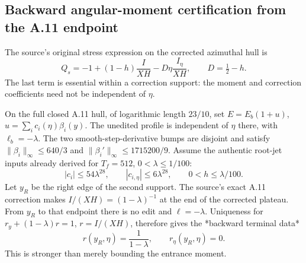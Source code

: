 \subsection*{Backward angular-moment certification from the A.11 endpoint}
\label{subsec:a11-backward-angular-endpoint-20261021}
The source's original stress expression on the corrected azimuthal hull is
\[
Q_s=-1+(1-h)\frac{I}{XH}-D\eta\frac{I_\eta}{XH},
\qquad D=\tfrac12-h.
\]
The last term is essential within a correction support: the moment
and correction coefficients need not be independent of \(\eta\).

On the full closed A.11 hull, of logarithmic length \(23/10\), set
\(E=E_b(1+u)\), \(u=\sum_i c_i(\eta)\beta_i(y)\).
The unedited profile is independent of \(\eta\) there, with
\(\ell_b=-\lambda\). The two smooth-step-derivative bumps are
disjoint and satisfy
\(\|\beta_i\|_\infty\le640/3\) and
\(\|\beta_i'\|_\infty\le1715200/9\).
Assume the authentic root-jet inputs already derived for
\(T_f=512\), \(0<\lambda\le1/100\):
\[
|c_i|\le54\lambda^{28},\qquad
|c_{i,\eta}|\le6\lambda^{28},\qquad
0<h\le\lambda/100.
\]
Let \(y_R\) be the right edge of the second support. The
source's exact A.11 correction makes \(I/(XH)=(1-\lambda)^{-1}\)
at the end of the corrected plateau. From \(y_R\) to that
endpoint there is no edit and \(\ell=-\lambda\). Uniqueness for
\(r_y+(1-\lambda)r=1\), \(r=I/(XH)\), therefore gives the
*backward terminal data*
\[
r(y_R,\eta)=\frac1{1-\lambda},\qquad
r_\eta(y_R,\eta)=0.
\]
This is stronger than merely bounding the entrance moment.

